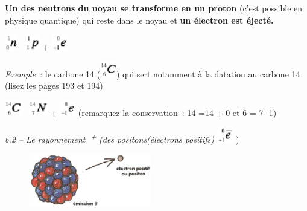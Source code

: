 \textbf{Un des neutrons du noyau se transforme en un proton} (c'est
possible en physique quantique) qui reste dans le noyau et \textbf{un
électron est éjecté.}

\includegraphics[width=0.565cm,height=0.683cm]{Pictures/10000001000000100000001354D441094A28B79D.png}

\includegraphics[width=0.613cm,height=0.683cm]{Pictures/10000001000000110000001313D14D1355E58698.png}
+
\includegraphics[width=0.683cm,height=0.683cm]{Pictures/100000010000001300000013933991303C233C5E.png}

\emph{Exemple~}: le carbone 14
(\includegraphics[width=0.706cm,height=0.683cm]{Pictures/1000000100000014000000139893D1A91E50D164.png})
qui sert notamment à la datation au carbone 14 (lisez les pages 193 et
194)

\includegraphics[width=0.706cm,height=0.683cm]{Pictures/1000000100000014000000139893D1A91E50D164.png}

\includegraphics[width=0.825cm,height=0.683cm]{Pictures/10000001000000170000001387F43E8F08B678A8.png}
+
\includegraphics[width=0.683cm,height=0.683cm]{Pictures/100000010000001300000013933991303C233C5E.png}
(remarquez la conservation~: 14 =14 + 0 et 6 = 7 -1)

\emph{b.2 -- Le rayonnement }\textsuperscript{\emph{+}}\emph{ (des
positons(électrons positifs)}
\includegraphics[width=0.706cm,height=0.683cm]{Pictures/1000000100000014000000131B1712312E317641.png}
)

\begin{figure}
\centering
\includegraphics[width=5.373cm,height=2.281cm]{Pictures/10000000000001E0000000CD0A7EA401296A8942.jpg}
\caption{}
\end{figure}

